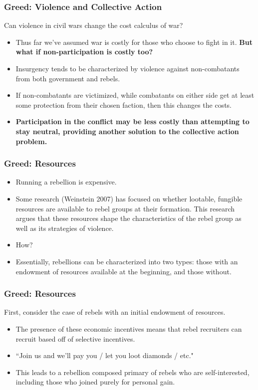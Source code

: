\documentclass{beamer}
\begin{document}
\begin{frame} 
	\frametitle{\LARGE{Greed: Violence and Collective Action}}
	Can violence in civil wars change the cost calculus of war?
	\begin{itemize}
		\item Thus far we've assumed war is costly for those who choose to fight in it. \textbf{But what if non-participation is costly too?} \pause
		\item Insurgency tends to be characterized by violence against non-combatants from both government and rebels. 
		\item If non-combatants are victimized, while combatants on either side get at least some protection from their chosen faction, then this changes the costs.
		\item \textbf{Participation in the conflict may be less costly than attempting to stay neutral, providing another solution to the collective action problem.}
	\end{itemize}
\end{frame}

\begin{frame} 
	\frametitle{\LARGE{Greed: Resources}}
	\begin{itemize}
		\item Running a rebellion is expensive. \pause
		\item Some research (Weinstein 2007) has focused on whether lootable, fungible resources are available to rebel groups at their formation. This research argues that these resources shape the characteristics of the rebel group as well as its strategies of violence. \pause
		\item How? 
		\item Essentially, rebellions can be characterized into two types: those with an endowment of resources available at the beginning, and those without. 
	\end{itemize}
\end{frame}

\begin{frame} 
	\frametitle{\LARGE{Greed: Resources}}
First, consider the case of rebels with an initial endowment of resources.
	\begin{itemize}
		\item The presence of these economic incentives means that rebel recruiters can recruit based off of selective incentives. \pause
		\item ``Join us and we'll pay you / let you loot diamonds / etc."
		\item This leads to a rebellion composed primary of rebels who are self-interested, including those who joined purely for personal gain.
	\end{itemize}
\end{frame}
\end{document}
